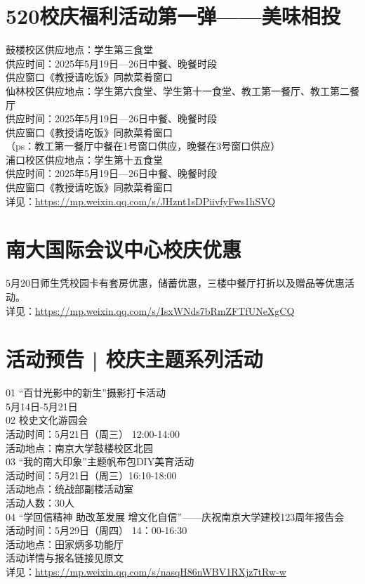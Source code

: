 \documentclass[letterpaper, 12pt]{article}
\begin{document}
\begin{multicols}{2}
\section{520校庆福利活动第一弹——美味相投} %
鼓楼校区供应地点：学生第三食堂
\\供应时间：2025年5月19日—26日中餐、晚餐时段
\\供应窗口《教授请吃饭》同款菜肴窗口
\\仙林校区供应地点：学生第六食堂、学生第十一食堂、教工第一餐厅、教工第二餐厅
\\供应时间：2025年5月19日—26日中餐、晚餐时段
\\供应窗口《教授请吃饭》同款菜肴窗口
\\（ps：教工第一餐厅中餐在1号窗口供应，晚餐在3号窗口供应）
\\浦口校区供应地点：学生第十五食堂
\\供应时间：2025年5月19日—26日中餐、晚餐时段
\\供应窗口《教授请吃饭》同款菜肴窗口
\\详见：\url{https://mp.weixin.qq.com/s/JHznt1sDPiivfyFws1hSVQ}

\section{南大国际会议中心校庆优惠} %
5月20日师生凭校园卡有套房优惠，储蓄优惠，三楼中餐厅打折以及赠品等优惠活动。
\\详见：\url{https://mp.weixin.qq.com/s/IsxWNds7bRmZFTfUNeXgCQ}

\section{活动预告 | 校庆主题系列活动} %
01 “百廿光影中的新生”摄影打卡活动
\\5月14日-5月21日
\\02 校史文化游园会
\\活动时间：5月21日（周三） 12:00-14:00
\\活动地点：南京大学鼓楼校区北园
\\03 “我的南大印象”主题帆布包DIY美育活动
\\活动时间：5月21日（周三）16:10-18:00
\\活动地点：统战部副楼活动室
\\活动人数：30人
\\04 “学回信精神 助改革发展 增文化自信”——庆祝南京大学建校123周年报告会
\\活动时间：5月29日（周四） 14：00-16:30
\\活动地点：田家炳多功能厅
\\活动详情与报名链接见原文
\\详见：\url{https://mp.weixin.qq.com/s/nasqH86nWBV1RXjz7tRw-w}


\end{multicols}
\end{document}
